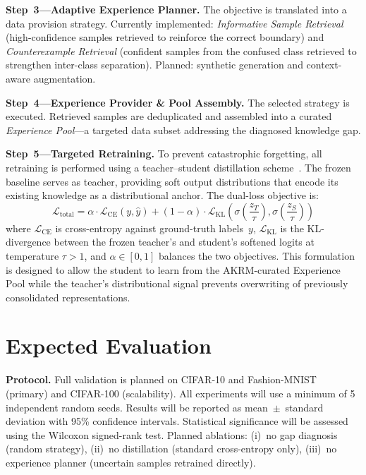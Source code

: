 \documentclass[conference]{IEEEtran}
\begin{document}
\textbf{Step~3---Adaptive Experience Planner.}
The objective is translated into a data provision strategy. Currently implemented: \emph{Informative Sample Retrieval} (high-confidence samples retrieved to reinforce the correct boundary) and \emph{Counterexample Retrieval} (confident samples from the confused class retrieved to strengthen inter-class separation). Planned: synthetic generation and context-aware augmentation.

\textbf{Step~4---Experience Provider \& Pool Assembly.}
The selected strategy is executed. Retrieved samples are deduplicated and assembled into a curated \emph{Experience Pool}---a targeted data subset addressing the diagnosed knowledge gap.

\textbf{Step~5---Targeted Retraining.}
To prevent catastrophic forgetting, all retraining is performed using a teacher--student distillation scheme~\cite{hinton2015distilling}. The frozen baseline serves as teacher, providing soft output distributions that encode its existing knowledge as a distributional anchor. The dual-loss objective is:
\begin{equation}
\mathcal{L}_{\text{total}} = \alpha \cdot \mathcal{L}_{\text{CE}}(y, \hat{y}) + (1-\alpha) \cdot \mathcal{L}_{\text{KL}}\!\left(\sigma\!\left(\frac{z_T}{\tau}\right), \sigma\!\left(\frac{z_S}{\tau}\right)\right)
\end{equation}
where $\mathcal{L}_{\text{CE}}$ is cross-entropy against ground-truth labels~$y$, $\mathcal{L}_{\text{KL}}$ is the KL-divergence between the frozen teacher's and student's softened logits at temperature $\tau > 1$, and $\alpha \in [0,1]$ balances the two objectives. This formulation is designed to allow the student to learn from the AKRM-curated Experience Pool while the teacher's distributional signal prevents overwriting of previously consolidated representations.

\section{Expected Evaluation}

\textbf{Protocol.}
Full validation is planned on CIFAR-10 and Fashion-MNIST (primary) and CIFAR-100 (scalability). All experiments will use a minimum of 5 independent random seeds. Results will be reported as mean~$\pm$~standard deviation with 95\% confidence intervals. Statistical significance will be assessed using the Wilcoxon signed-rank test. Planned ablations: (i)~no gap diagnosis (random strategy), (ii)~no distillation (standard cross-entropy only), (iii)~no experience planner (uncertain samples retrained directly).
\end{document}
